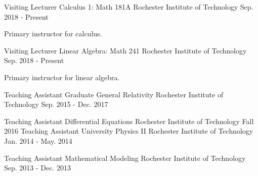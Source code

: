 \begin{cventries}
 
   \cventry
    {Visiting Lecturer}
    {Calculus 1: Math 181A}
    {Rochester Institute of Technology}
    {Sep. 2018 - Present}
    {
      \begin{cvitems}
        \item {Primary instructor for calculus. }
      \end{cvitems}
    }
    
       \cventry
    {Visiting Lecturer}
    {Linear Algebra: Math 241}
    {Rochester Institute of Technology}
    {Sep. 2018 - Present}
    {
      \begin{cvitems}
        \item {Primary instructor for linear algebra.}
      \end{cvitems}
    }
    
  \cventry
    {Teaching Assistant}
    {Graduate General Relativity}
    {Rochester Institute of Technology}
    {Sep. 2015 - Dec. 2017}
    {
      \begin{cvitems}
      \end{cvitems}
    }
  \cventry
    {Teaching Assistant}
    {Differential Equations}
    {Rochester Institute of Technology}
    {Fall 2016}
    {
    }
 \cventry
    {Teaching Assistant}
    {University Physics II}
    {Rochester Institute of Technology}
    {Jan. 2014 - May. 2014}
    {
    }

  \cventry
    {Teaching Assistant}
    {Mathematical Modeling}
    {Rochester Institute of Technology}
    {Sep. 2013 - Dec. 2013}
    {
    }
\end{cventries}
